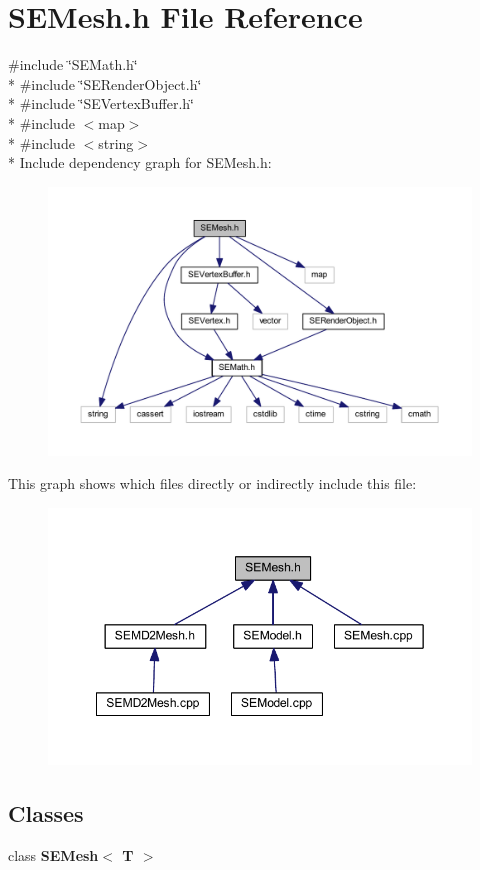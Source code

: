 \section{S\+E\+Mesh.\+h File Reference}
\label{_s_e_mesh_8h}
{\ttfamily \#include \char`\"{}S\+E\+Math.\+h\char`\"{}}\\*
{\ttfamily \#include \char`\"{}S\+E\+Render\+Object.\+h\char`\"{}}\\*
{\ttfamily \#include \char`\"{}S\+E\+Vertex\+Buffer.\+h\char`\"{}}\\*
{\ttfamily \#include $<$map$>$}\\*
{\ttfamily \#include $<$string$>$}\\*
Include dependency graph for S\+E\+Mesh.\+h\+:
\nopagebreak
\begin{figure}[H]
\begin{center}
\leavevmode
\includegraphics[width=350pt]{_s_e_mesh_8h__incl}
\end{center}
\end{figure}
This graph shows which files directly or indirectly include this file\+:
\nopagebreak
\begin{figure}[H]
\begin{center}
\leavevmode
\includegraphics[width=349pt]{_s_e_mesh_8h__dep__incl}
\end{center}
\end{figure}
\subsection*{Classes}
\begin{DoxyCompactItemize}
\item 
class {\bf S\+E\+Mesh$<$ T $>$}
\end{DoxyCompactItemize}
